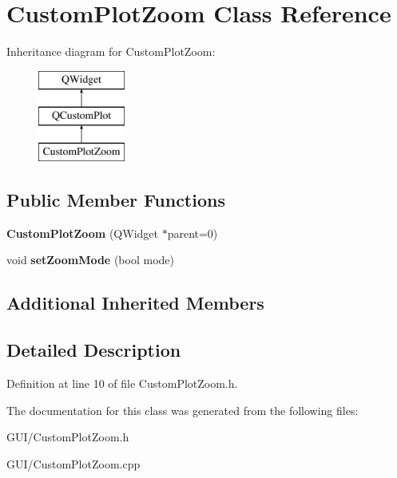 \hypertarget{class_custom_plot_zoom}{}\section{Custom\+Plot\+Zoom Class Reference}
\label{class_custom_plot_zoom}
Inheritance diagram for Custom\+Plot\+Zoom\+:\begin{figure}[H]
\begin{center}
\leavevmode
\includegraphics[height=3.000000cm]{class_custom_plot_zoom}
\end{center}
\end{figure}
\subsection*{Public Member Functions}
\begin{DoxyCompactItemize}
\item 
\mbox{\label{class_custom_plot_zoom_a513427bc1ee4a80e58175d7b08cdabf6}} 
{\bfseries Custom\+Plot\+Zoom} (Q\+Widget $\ast$parent=0)
\item 
\mbox{\label{class_custom_plot_zoom_a4bcc9b6e52a26963b715227d0ba07d54}} 
void {\bfseries set\+Zoom\+Mode} (bool mode)
\end{DoxyCompactItemize}
\subsection*{Additional Inherited Members}


\subsection{Detailed Description}


Definition at line 10 of file Custom\+Plot\+Zoom.\+h.



The documentation for this class was generated from the following files\+:\begin{DoxyCompactItemize}
\item 
G\+U\+I/Custom\+Plot\+Zoom.\+h\item 
G\+U\+I/Custom\+Plot\+Zoom.\+cpp\end{DoxyCompactItemize}
